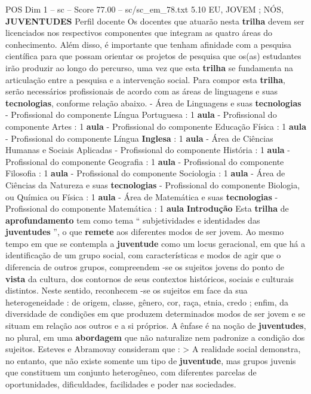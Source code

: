 \begin{textsample}{POS Dim 1 – sc – Score 77.00 – sc/sc\_em\_78.txt}  \label{ex:f1_pos_005}
5.10 EU, JOVEM ; NÓS, \textbf{JUVENTUDES} Perfil docente Os docentes que atuarão nesta \textbf{trilha} devem ser licenciados nos respectivos componentes que integram as quatro áreas do conhecimento.
Além disso, é importante que tenham afinidade com a pesquisa científica para que possam orientar os projetos de pesquisa que os(as) estudantes irão produzir ao longo do percurso, uma vez que esta \textbf{trilha} se fundamenta na articulação entre a pesquisa e a intervenção social.
Para compor esta \textbf{trilha}, serão necessários profissionais de acordo com as áreas de linguagens e suas \textbf{tecnologias}, conforme relação abaixo. - Área de Linguagens e suas \textbf{tecnologias} - Profissional do componente Língua Portuguesa : 1 \textbf{aula} - Profissional do componente Artes : 1 \textbf{aula} - Profissional do componente Educação Física : 1 \textbf{aula} - Profissional do componente Língua \textbf{Inglesa} : 1 \textbf{aula} - Área de Ciências Humanas e Sociais Aplicadas - Profissional do componente História : 1 \textbf{aula} - Profissional do componente Geografia : 1 \textbf{aula} - Profissional do componente Filosofia : 1 \textbf{aula} - Profissional do componente Sociologia : 1 \textbf{aula} - Área de Ciências da Natureza e suas \textbf{tecnologias} - Profissional do componente Biologia, ou Química ou Física : 1 \textbf{aula} - Área de Matemática e suas \textbf{tecnologias} - Profissional do componente Matemática : 1 \textbf{aula} \textbf{Introdução} Esta \textbf{trilha} de \textbf{aprofundamento} tem como tema “ subjetividades e identidades das \textbf{juventudes} ”, o que \textbf{remete} aos diferentes modos de ser jovem.
Ao mesmo tempo em que se contempla a \textbf{juventude} como um locus geracional, em que há a identificação de um grupo social, com características e modos de agir que o diferencia de outros grupos, compreendem -se os sujeitos jovens do ponto de \textbf{vista} da cultura, dos contornos de seus contextos históricos, sociais e culturais distintos.
Neste sentido, reconhecem -se os sujeitos em face da sua heterogeneidade : de origem, classe, gênero, cor, raça, etnia, credo ; enfim, da diversidade de condições em que produzem determinados modos de ser jovem e se situam em relação aos outros e a si próprios.
A ênfase é na noção de \textbf{juventudes}, no plural, em uma \textbf{abordagem} que não naturalize nem padronize a condição dos sujeitos.
Esteves e Abramovay consideram que : > A realidade social demonstra, no entanto, que não existe somente um tipo de \textbf{juventude}, mas grupos juvenis que constituem um conjunto heterogêneo, com diferentes parcelas de oportunidades, dificuldades, facilidades e poder nas sociedades.

\end{textsample}
